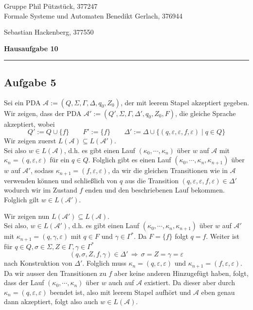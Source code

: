\documentclass[a4paper,graphics,11pt]{article}
\newcommand{\aufgabe}[1]{\subsection*{Aufgabe #1}}
\begin{document}
\noindent Gruppe              \hfill Phil Pützstück, 377247\\
\noindent Formale Systeme und Automaten \hfill Benedikt Gerlach, 376944\\
\strut\hfill Sebastian Hackenberg, 377550\\
\begin{center}
	\LARGE{\textbf{Hausaufgabe 10}}
\end{center}
\begin{center}
\rule[0.1ex]{\textwidth}{1pt}
\end{center}



\aufgabe{5}
Sei ein PDA $\mathcal{A} := (Q, \Sigma, \Gamma, \Delta, q_0, Z_0)$, der mit
leerem Stapel akzeptiert gegeben.\\
Wir zeigen, dass der PDA $\mathcal{A}' := (Q', \Sigma, \Gamma, \Delta', q_0, Z_0, F)$,
die gleiche Sprache akzeptiert,
wobei
$$
    Q' := Q \cup \{f\}\qquad
    F' := \{f\}\qquad
    \Delta' := \Delta \cup \{(q, \varepsilon, \varepsilon, f, \varepsilon) \mid q \in Q\}
$$
Wir zeigen zuerst $L(\mathcal{A}) \subseteq L(\mathcal{A}')$.\\
Sei also $w \in L(\mathcal{A})$, d.h. es gibt einen Lauf $(\kappa_0, \cdots, \kappa_n)$
über $w$ auf $\mathcal{A}$ mit $\kappa_n = (q, \varepsilon, \varepsilon)$ für ein
$q \in Q$.
Folglich gibt es einen Lauf $(\kappa_0, \cdots, \kappa_n, \kappa_{n+1})$ über $w$
auf $\mathcal{A}'$, sodass $\kappa_{n+1} = (f, \varepsilon, \varepsilon)$,
da wir die gleichen Transitionen wie in $\mathcal{A}$ verwenden können und schließlich
von $q$ aus die Transition $(q, \varepsilon, \varepsilon, f, \varepsilon) \in \Delta'$
wodurch wir im Zustand $f$ enden und den beschriebenen Lauf bekommen.
Folglich gilt $w \in L(\mathcal{A}')$.

Wir zeigen nun $L(\mathcal{A}') \subseteq L(\mathcal{A})$.\\
Sei also, $w \in L(\mathcal{A}')$, d.h. es gibt einen Lauf $(\kappa_0, \cdots, \kappa_n, \kappa_{n+1})$ über $w$ auf $\mathcal{A}'$ mit $\kappa_{n+1} = (q, \gamma, \varepsilon)$ mit $q \in F$
und $\gamma \in \Gamma^*$. Da $F = \{f\}$ folgt $q = f$.
Weiter ist für $q \in Q, \sigma \in \Sigma, Z \in \Gamma, \gamma \in \Gamma^*$
$$
    (q, \sigma, Z, f, \gamma) \in \Delta' \,\Longrightarrow\, \sigma = Z = \gamma = \varepsilon
$$
nach Konstruktion von $\Delta'$. Folglich muss $\kappa_n = (q, \varepsilon, \varepsilon)$ und $\kappa_{n+1} = (f, \varepsilon, \varepsilon)$.
Da wir ausser den Transitionen zu $f$ aber keine anderen Hinzugefügt haben,
folgt, dass der Lauf $(\kappa_0, \cdots, \kappa_n)$ über $w$ auch auf
$\mathcal{A}$ existiert. Da dieser aber durch $\kappa_n = (q, \varepsilon, \varepsilon)$
beendet ist, also mit leerem Stapel aufhört und $\mathcal{A}$ eben genau dann
akzeptiert, folgt also auch $w \in L(\mathcal{A})$.
\end{document}
